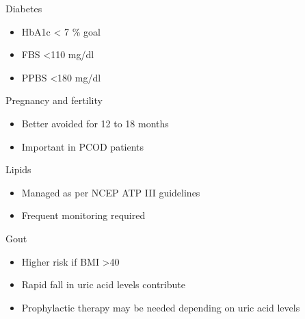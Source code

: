 \documentclass[11pt]{beamer}
\begin{document}
 \begin{frame}{Diabetes  }
 \begin{itemize}
 
 \item HbA1c < 7 \% goal
 \item FBS <110 mg/dl
 \item PPBS <180 mg/dl
 	
 \end{itemize}
 \end{frame} 
 \begin{frame}{Pregnancy and fertility  }
 \begin{itemize}
 
 \item Better avoided for 12 to 18 months 
 \item Important in PCOD patients
 	
 \end{itemize}
 \end{frame} 
 \begin{frame}{Lipids  }
 \begin{itemize}
 
 \item Managed as per NCEP ATP III guidelines
 \item Frequent monitoring required
 	
 \end{itemize}
 \end{frame}
 \begin{frame}{ Gout }
 \begin{itemize}
 
 \item Higher risk if BMI >40
 \item Rapid fall in uric acid levels contribute
 \item Prophylactic therapy may be needed depending on uric acid levels
 	
 \end{itemize}
 \end{frame}
\end{document}
